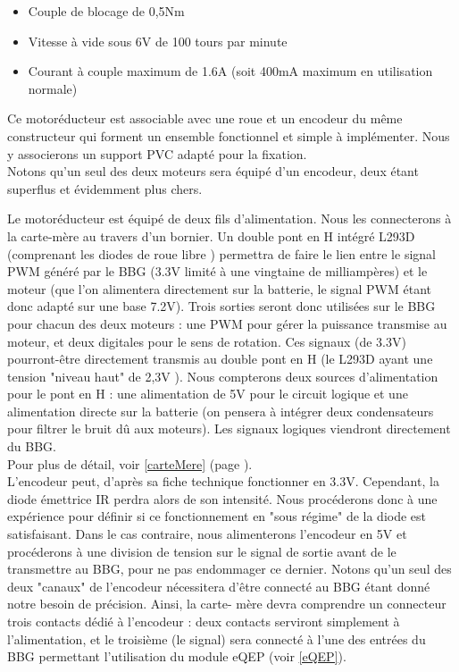 			\begin{itemize}
				\item Couple de blocage de 0,5Nm
				\item Vitesse à vide sous 6V de 100 tours par minute
				\item Courant à couple maximum de 1.6A (soit 400mA maximum en utilisation normale)
			\end{itemize}


			Ce motoréducteur est associable avec une roue et un encodeur du même constructeur qui forment un ensemble fonctionnel et simple à implémenter. Nous y associerons un support PVC adapté pour la fixation.\\
			Notons qu'un seul des deux moteurs sera équipé d'un encodeur, deux étant superflus et évidemment plus chers.

			Le motoréducteur est équipé de deux fils d'alimentation. Nous les connecterons à la carte-mère au travers d'un bornier. Un double pont en H intégré L293D (comprenant les diodes de roue libre \cite{bib17}) permettra de faire le lien entre le signal PWM généré par le BBG (3.3V limité à une vingtaine de milliampères) et le moteur (que l'on alimentera directement sur la batterie, le signal PWM étant donc adapté sur une base 7.2V). Trois sorties seront donc utilisées sur le BBG pour chacun des deux moteurs : une PWM pour gérer la puissance transmise au moteur, et deux digitales pour le sens de rotation. Ces signaux (de 3.3V) pourront-être directement transmis au double pont en H (le L293D ayant une tension "niveau haut" de 2,3V \cite{bib17}). Nous compterons deux sources d'alimentation pour le pont en H : une alimentation de 5V pour le circuit logique et une alimentation directe sur la batterie (on pensera à intégrer deux condensateurs pour filtrer le bruit dû aux moteurs). Les signaux logiques viendront directement du BBG.\\

			Pour plus de détail, voir \ref{carteMere} (page \pageref{carteMere}).\\

			L'encodeur peut, d'après sa fiche technique \cite{bib9} fonctionner en 3.3V. Cependant, la diode émettrice IR perdra alors de son intensité. Nous procéderons donc à une expérience pour définir si ce fonctionnement en "sous régime" de la diode est satisfaisant. Dans le cas contraire, nous alimenterons l'encodeur en 5V et procéderons à une division de tension sur le signal de sortie avant de le transmettre au BBG, pour ne pas endommager ce dernier. Notons qu'un seul des deux "canaux" de l'encodeur nécessitera d'être connecté au BBG étant donné notre besoin de précision. Ainsi, la carte- mère devra comprendre un connecteur trois contacts dédié à l'encodeur : deux contacts serviront simplement à l'alimentation, et le troisième (le signal) sera connecté à l'une des entrées du BBG permettant l'utilisation du module eQEP (voir \ref{eQEP}).

